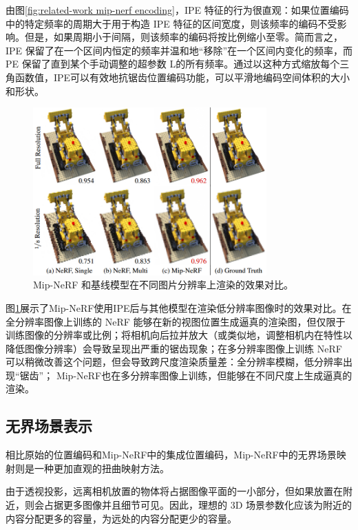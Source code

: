 由图\ref{fig:related-work mip-nerf encoding}，IPE 特征的行为很直观：如果位置编码中的特定频率的周期大于用于构造 IPE 特征的区间宽度，则该频率的编码不受影响。但是，如果周期小于间隔，则该频率的编码将按比例缩小至零。简而言之，IPE 保留了在一个区间内恒定的频率并温和地“移除”在一个区间内变化的频率，而 PE 保留了直到某个手动调整的超参数 L的所有频率。通过以这种方式缩放每个三角函数值，IPE可以有效地抗锯齿位置编码功能，可以平滑地编码空间体积的大小和形状。

\begin{figure}[h]
    \centering
    \includegraphics[width=0.8\textwidth]{undergraduate-thesis/images/related-work/mipnerf-multi-scale.png}
    \caption{Mip-NeRF 和基线模型在不同图片分辨率上渲染的效果对比。}
    \label{fig:related-work mip-nerf results}
\end{figure}

图\ref{fig:related-work mip-nerf results}展示了Mip-NeRF使用IPE后与其他模型在渲染低分辨率图像时的效果对比。在全分辨率图像上训练的 NeRF 能够在新的视图位置生成逼真的渲染图，但仅限于训练图像的分辨率或比例；将相机向后拉并放大（或类似地，调整相机内在特性以降低图像分辨率）会导致呈现出严重的锯齿现象；在多分辨率图像上训练 NeRF 可以稍微改善这个问题，但会导致跨尺度渲染质量差：全分辨率模糊，低分辨率出现“锯齿”； Mip-NeRF也在多分辨率图像上训练，但能够在不同尺度上生成逼真的渲染。

\subsection{无界场景表示}
相比原始的位置编码和Mip-NeRF中的集成位置编码，Mip-NeRF中的无界场景映射则是一种更加直观的扭曲映射方法。

由于透视投影，远离相机放置的物体将占据图像平面的一小部分，但如果放置在附近，则会占据更多图像并且细节可见。因此，理想的 3D 场景参数化应该为附近的内容分配更多的容量，为远处的内容分配更少的容量。

